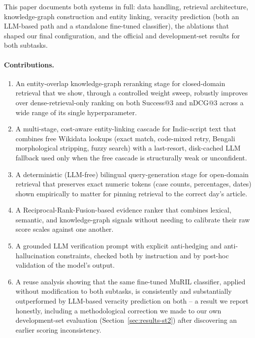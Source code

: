 \documentclass[
]{ceurart}
\begin{document}
This paper documents both systems in full: data handling, retrieval
architecture, knowledge-graph construction and entity linking, veracity
prediction (both an LLM-based path and a standalone fine-tuned
classifier), the ablations that shaped our final configuration, and the
official and development-set results for both subtasks.

\paragraph{Contributions.}
\begin{enumerate}
  \item An entity-overlap knowledge-graph reranking stage for
    closed-domain retrieval that we show, through a controlled weight
    sweep, robustly improves over dense-retrieval-only ranking on both
    Success@3 and nDCG@3 across a wide range of its single
    hyperparameter.
  \item A multi-stage, cost-aware entity-linking cascade for
    Indic-script text that combines free Wikidata lookups (exact match,
    code-mixed retry, Bengali morphological stripping, fuzzy search)
    with a last-resort, disk-cached LLM fallback used only when the
    free cascade is structurally weak or unconfident.
  \item A deterministic (LLM-free) bilingual query-generation stage for
    open-domain retrieval that preserves exact numeric tokens (case
    counts, percentages, dates) shown empirically to matter for pinning
    retrieval to the correct day's article.
  \item A Reciprocal-Rank-Fusion-based evidence ranker that combines
    lexical, semantic, and knowledge-graph signals without needing to
    calibrate their raw score scales against one another.
  \item A grounded LLM verification prompt with explicit anti-hedging
    and anti-hallucination constraints, checked both by instruction and
    by post-hoc validation of the model's output.
  \item A reuse analysis showing that the same fine-tuned MuRIL
    classifier, applied without modification to both subtasks, is
    consistently and substantially outperformed by LLM-based veracity
    prediction on both -- a result we report honestly, including a
    methodological correction we made to our own development-set
    evaluation (Section~\ref{sec:results-st2}) after discovering an
    earlier scoring inconsistency.
\end{enumerate}
\end{document}
